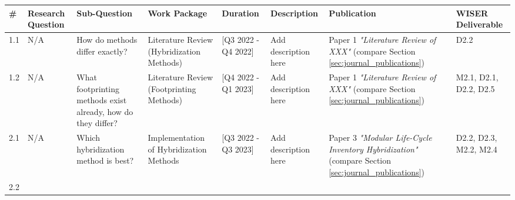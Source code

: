 \documentclass{article}
\begin{document}
    
    \begin{landscape}

    \begin{table}[H]
        \centering
        \begin{tabularx}{\linewidth}{|l|X|X|X|X|X|X|X|}
            \hline
                \textbf{\#}
                &
                \textbf{Research Question}
                &
                \textbf{Sub-Question}
                &
                \textbf{Work Package}
                &
                \textbf{Duration}
                &
                \textbf{Description}
                & 
                \textbf{Publication}
                &
                \textbf{WISER Deliverable}
            \\
            \hline
            \hline
                1.1
                &
                N/A
                &
                How do methods differ exactly?
                &
                Literature Review (Hybridization Methods)
                &
                [Q3 2022 - Q4 2022]
                &
                Add description here
                &
                Paper 1 \textit{"Literature Review of XXX"} (compare Section \ref{sec:journal_publications})
                &
                D2.2
            \\
            \hline
                1.2
                &
                N/A
                &
                What footprinting methods exist already, how do they differ?
                &
                Literature Review (Footprinting Methods)
                &
                [Q4 2022 - Q1 2023]
                &
                Add description here
                &
                Paper 1 \textit{"Literature Review of XXX"} (compare Section \ref{sec:journal_publications})
                &
                M2.1, D2.1, D2.2, D2.5
            \\
            \hline
            \hline
                2.1
                &
                N/A
                &
                Which hybridization method is best?
                &
                Implementation of Hybridization Methods
                &
                [Q3 2022 - Q3 2023]
                &
                Add description here
                &
                Paper 3 \textit{"Modular Life-Cycle Inventory Hybridization"} (compare Section \ref{sec:journal_publications})
                &
                D2.2, D2.3, M2.2, M2.4
            \\
            \hline
                2.2
                &

\end{tabularx}
\end{table}
\end{landscape}
\end{document}
